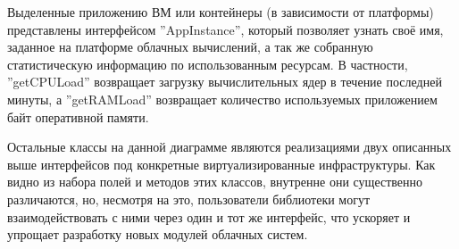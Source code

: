 Выделенные приложению ВМ или контейнеры (в зависимости от платформы) представлены интерфейсом ''AppInstance'', который позволяет узнать своё имя, заданное на платформе облачных вычислений, а так же собранную статистическую информацию по использованным ресурсам.
В частности, ''getCPULoad'' возвращает загрузку вычислительных ядер в течение последней минуты, а ''getRAMLoad'' возвращает количество используемых приложением байт оперативной памяти.

Остальные классы на данной диаграмме являются реализациями двух описанных выше интерфейсов под конкретные виртуализированные инфраструктуры.
Как видно из набора полей и методов этих классов, внутренне они существенно различаются, но, несмотря на это, пользователи библиотеки могут взаимодействовать с ними через один и тот же интерфейс, что ускоряет и упрощает разработку новых модулей облачных систем.
